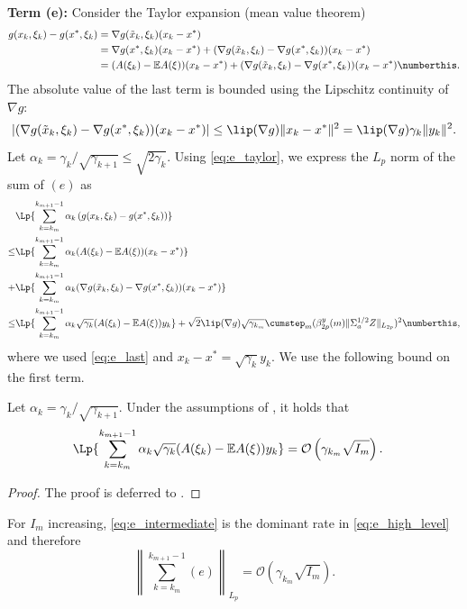 \documentclass[11pt]{article}
\begin{document}
\textbf{Term (e):}
Consider the Taylor expansion (mean value theorem)
\begin{align*}
    g(x_k, \xi_k) - g(x^*, \xi_k) 
    &= \nabla g(\tilde{x}_k, \xi_k) (x_k - x^* )
    \\ 
    &=  \nabla g(x^*, \xi_k) (x_k - x^*)  + (\nabla g(\tilde{x}_k, \xi_k) - \nabla g(x^*, \xi_k)) (x_k - x^* )
    \\ 
    &= (A(\xi_k) - \mathbb{E}A(\xi))  (x_k - x^*)
    +  (\nabla g(\tilde{x}_k, \xi_k) - \nabla g(x^*, \xi_k)) (x_k - x^*)
    \numberthis \label{eq:e_taylor}
    . 
\end{align*}
The absolute value of the last term is bounded using the Lipschitz continuity of $\nabla g$:
\begin{equation}\label{eq:e_last}
    \left\lvert (\nabla g(\tilde{x}_k, \xi_k) - \nabla g(x^*, \xi_k)) (x_k - x^*) \right\rvert 
    \leq \lip (\nabla g) \lVert x_k - x^* \rVert^2
    = \lip(\nabla g) \gamma_k \lVert y_k \rVert^2 .     
\end{equation}
Let $\alpha_k = \gamma_k/\sqrt{\gamma_{k+1}} \leq \sqrt{2 \gamma_k}$. 
Using \eqref{eq:e_taylor}, we express the $L_p$ norm of the sum of $(e)$ as
\begin{align*}
&\Lp{\sum_{k=k_m}^{k_{m+1} - 1}\alpha_k \left(g(x_k, \xi_k) - g(x^*, \xi_k)\right)}
\\ 
\leq&
\Lp{\sum_{k=k_m}^{k_{m+1} - 1} \alpha_k (A(\xi_k) - \mathbb{E}A(\xi))  (x_k - x^*) }
\\ + &
\Lp{\sum_{k=k_m}^{k_{m+1} - 1} \alpha_k (\nabla g(\tilde{x}_k, \xi_k) - \nabla g(x^*, \xi_k)) (x_k - x^*) }
\\ 
\leq &
\Lp{\sum_{k=k_m}^{k_{m+1} - 1} \alpha_k \sqrt{\gamma_k} (A(\xi_k) - \mathbb{E}A(\xi)) y_k}
+
\sqrt{2} \lip (\nabla g) \sqrt{\gamma_{k_m}} \cumstep_m (\beta_{2p}^y(m) \lVert \Sigma_a^{1/2}Z \rVert_{L_{2p}})^2
\numberthis \label{eq:e_high_level}
,
\end{align*}
where we used \eqref{eq:e_last} and $x_k - x^* = \sqrt{\gamma_k} y_k$.
We use the following bound on the first term.
\begin{lemma}\label{lem:e_bound}
    Let $\alpha_k = \gamma_k/\sqrt{\gamma_{k+1}}$.
    Under the assumptions of , it holds that
    \begin{equation}\label{eq:e_intermediate}
    \begin{split}
        &\Lp{\sum_{k=k_m}^{k_{m+1} - 1} \alpha_k \sqrt{\gamma_k} (A(\xi_k) - \mathbb{E}A(\xi))  y_k}
        = \mathcal{O}\left(\gamma_{k_m} \sqrt{I_m} \right)
        .
    \end{split}
    \end{equation}
\end{lemma}
\begin{proof}
    The proof is deferred to .
\end{proof}
For $I_m$ increasing, \eqref{eq:e_intermediate} is the dominant rate in \eqref{eq:e_high_level} and therefore
\begin{equation}\label{eq:ebound}
    \left\lVert \sum_{k=k_m}^{k_{m+1} - 1} (e) \right\rVert_{L_p}
    = \mathcal{O}(\gamma_{k_m} \sqrt{I_m})
    .     
\end{equation}
\end{document}
